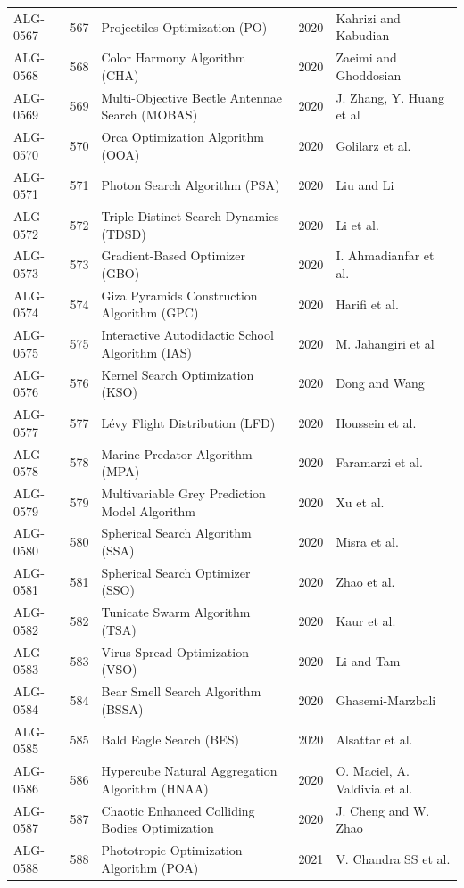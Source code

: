 \documentclass[8pt]{article}
\begin{document}
\begin{landscape}
\begin{longtable}{P{1.7cm}rP{10.0cm}rP{7.2cm}}
ALG-0567 & 567 & Projectiles Optimization (PO) & 2020 & Kahrizi and Kabudian \\
ALG-0568 & 568 & Color Harmony Algorithm (CHA) & 2020 & Zaeimi and Ghoddosian \\
ALG-0569 & 569 & Multi-Objective Beetle Antennae Search (MOBAS) & 2020 & J. Zhang, Y. Huang et al \\
ALG-0570 & 570 & Orca Optimization Algorithm (OOA) & 2020 & Golilarz et al. \\
ALG-0571 & 571 & Photon Search Algorithm (PSA) & 2020 & Liu and Li \\
ALG-0572 & 572 & Triple Distinct Search Dynamics (TDSD) & 2020 & Li et al. \\
ALG-0573 & 573 & Gradient-Based Optimizer (GBO) & 2020 & I. Ahmadianfar et al. \\
ALG-0574 & 574 & Giza Pyramids Construction Algorithm (GPC) & 2020 & Harifi et al. \\
ALG-0575 & 575 & Interactive Autodidactic School Algorithm (IAS) & 2020 & M. Jahangiri et al \\
ALG-0576 & 576 & Kernel Search Optimization (KSO) & 2020 & Dong and Wang \\
ALG-0577 & 577 & Lévy Flight Distribution (LFD) & 2020 & Houssein et al. \\
ALG-0578 & 578 & Marine Predator Algorithm (MPA) & 2020 & Faramarzi et al. \\
ALG-0579 & 579 & Multivariable Grey Prediction Model Algorithm & 2020 & Xu et al. \\
ALG-0580 & 580 & Spherical Search Algorithm (SSA) & 2020 & Misra et al. \\
ALG-0581 & 581 & Spherical Search Optimizer (SSO) & 2020 & Zhao et al. \\
ALG-0582 & 582 & Tunicate Swarm Algorithm (TSA) & 2020 & Kaur et al. \\
ALG-0583 & 583 & Virus Spread Optimization (VSO) & 2020 & Li and Tam \\
ALG-0584 & 584 & Bear Smell Search Algorithm (BSSA) & 2020 & Ghasemi-Marzbali \\
ALG-0585 & 585 & Bald Eagle Search (BES) & 2020 & Alsattar et al. \\
ALG-0586 & 586 & Hypercube Natural Aggregation Algorithm (HNAA) & 2020 & O. Maciel, A. Valdivia et al. \\
ALG-0587 & 587 & Chaotic Enhanced Colliding Bodies Optimization & 2020 & J. Cheng and W. Zhao \\
ALG-0588 & 588 & Phototropic Optimization Algorithm (POA) & 2021 & V. Chandra SS et al. \\

\end{longtable}
\end{landscape}
\end{document}
